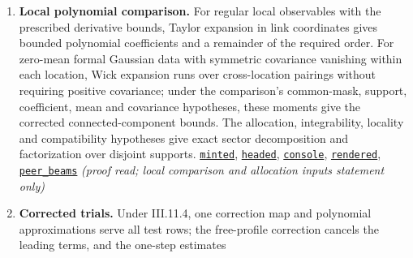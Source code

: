 \documentclass[
  letterpaper,
  11pt]{article}
\begin{document}
\begin{enumerate}
  This is the Schur-complement identity on the curl image; uniform
  resolvent estimates give the propagation constant for fixed kernel
  choices and stage indices \(j,t\ge4\) in the range \(d-1\le j-2\)
  (natural-number subtraction).
  \href{https://github.com/yang-mills-group/OpenAI-YM-20261028/blob/3456e5e75cf8d4cd558955a5c7638fba2d68f464/YM/PhysicalNext/RANK_COVARIANCE_ATLAS/Identity.lean\#L198-L213}{\texttt{one\_fold}},
  \href{https://github.com/yang-mills-group/OpenAI-YM-20261028/blob/3456e5e75cf8d4cd558955a5c7638fba2d68f464/YM/PhysicalNext/RANK_COVARIANCE_ATLAS/Step.lean\#L106-L116}{\texttt{train\_issue}}
\item
  \textbf{Local polynomial comparison.} For regular local observables
  with the prescribed derivative bounds, Taylor expansion in link
  coordinates gives bounded polynomial coefficients and a remainder of
  the required order. For zero-mean formal Gaussian data with symmetric
  covariance vanishing within each location, Wick expansion runs over
  cross-location pairings without requiring positive covariance; under
  the comparison's common-mask, support, coefficient, mean and
  covariance hypotheses, these moments give the corrected
  connected-component bounds. The allocation, integrability, locality
  and compatibility hypotheses give exact sector decomposition and
  factorization over disjoint supports.
  \href{https://github.com/yang-mills-group/OpenAI-YM-20261028/blob/3456e5e75cf8d4cd558955a5c7638fba2d68f464/YM/Next/RANK/LineBox.lean\#L168-L205}{\texttt{minted}},
  \href{https://github.com/yang-mills-group/OpenAI-YM-20261028/blob/3456e5e75cf8d4cd558955a5c7638fba2d68f464/YM/Next/RANK/GaussTrack.lean\#L131-L173}{\texttt{headed}},
  \href{https://github.com/yang-mills-group/OpenAI-YM-20261028/blob/3456e5e75cf8d4cd558955a5c7638fba2d68f464/YM/Next/RANK/Festoon.lean\#L57-L126}{\texttt{console}},
  \href{https://github.com/yang-mills-group/OpenAI-YM-20261028/blob/3456e5e75cf8d4cd558955a5c7638fba2d68f464/YM/PhysicalNext/AFTERNOON_INTERACTING_RANK_COMPARISON/Rendered.lean\#L36-L86}{\texttt{rendered}},
  \href{https://github.com/yang-mills-group/OpenAI-YM-20261028/blob/3456e5e75cf8d4cd558955a5c7638fba2d68f464/YM/PhysicalNext/AFTERNOON_INTERACTING_RANK_COMPARISON/Sight.lean\#L132-L158}{\texttt{peer\_beams}}
  \emph{(proof read; local comparison and allocation inputs statement
  only)}
\item
  \textbf{Corrected trials.} Under III.11.4, one correction map and
  polynomial approximations serve all test rows; the free-profile
  correction cancels the leading terms, and the one-step estimates

\end{enumerate}
\end{document}

